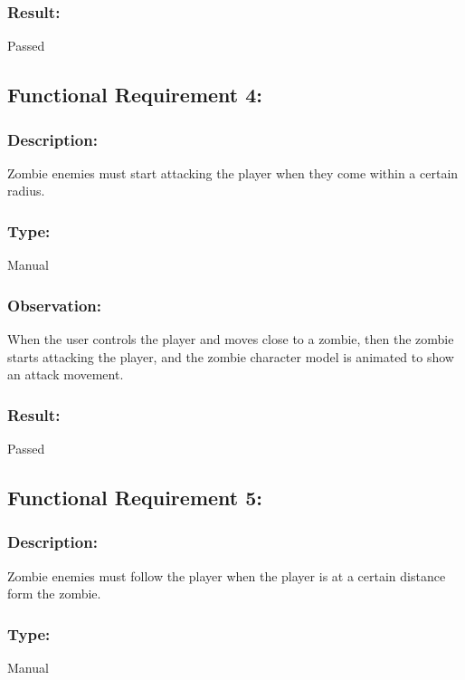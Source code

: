 \documentclass[12pt, titlepage]{article}
\begin{document}
\subsubsection[Pass / Fail:] {Result: } Passed


\subsection{Functional Requirement 4: } 

\subsubsection{Description: }Zombie enemies must start attacking the player when they come within a certain radius.

\subsubsection{Type: } Manual

\subsubsection{Observation: } When the user controls the player and moves close to a zombie, then the zombie starts attacking the player, and the zombie character model is animated to show an attack movement.

\subsubsection[Pass / Fail:] {Result: } Passed


\subsection{Functional Requirement 5: } 

\subsubsection{Description: }Zombie enemies must follow the player when the player is at a certain distance form the zombie.

\subsubsection{Type: } Manual
\end{document}
